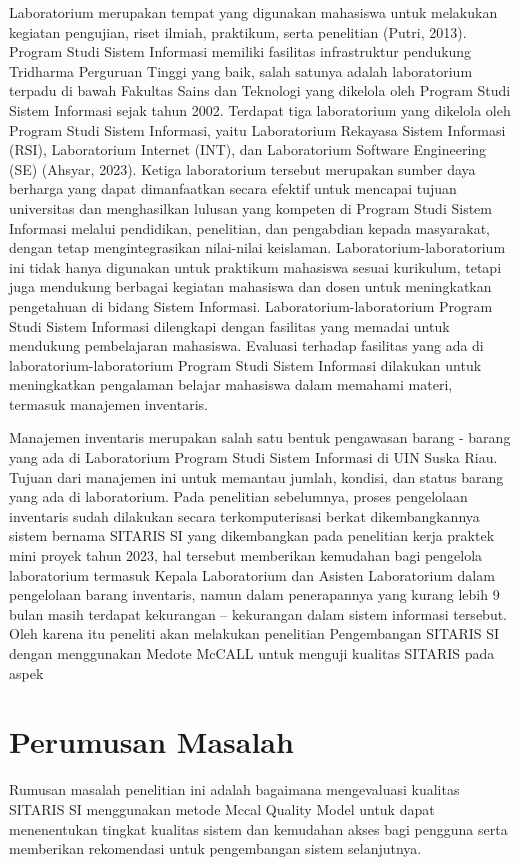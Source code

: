 Laboratorium merupakan tempat yang digunakan mahasiswa untuk melakukan kegiatan pengujian, riset ilmiah, praktikum, serta penelitian (Putri, 2013). Program Studi Sistem Informasi memiliki fasilitas infrastruktur pendukung Tridharma Perguruan Tinggi yang baik, salah satunya adalah laboratorium terpadu di bawah Fakultas Sains dan Teknologi yang dikelola oleh Program Studi Sistem Informasi sejak tahun 2002. Terdapat tiga laboratorium yang dikelola oleh Program Studi Sistem Informasi, yaitu Laboratorium Rekayasa Sistem Informasi (RSI), Laboratorium Internet (INT), dan Laboratorium Software Engineering (SE) (Ahsyar, 2023). Ketiga laboratorium tersebut merupakan sumber daya berharga yang dapat dimanfaatkan secara efektif untuk mencapai tujuan universitas dan menghasilkan lulusan yang kompeten di Program Studi Sistem Informasi melalui pendidikan, penelitian, dan pengabdian kepada masyarakat, dengan tetap mengintegrasikan nilai-nilai keislaman. Laboratorium-laboratorium ini tidak hanya digunakan untuk praktikum mahasiswa sesuai kurikulum, tetapi juga mendukung berbagai kegiatan mahasiswa dan dosen untuk meningkatkan pengetahuan di bidang Sistem Informasi. Laboratorium-laboratorium Program Studi Sistem Informasi dilengkapi dengan fasilitas yang memadai untuk mendukung pembelajaran mahasiswa. Evaluasi terhadap fasilitas yang ada di laboratorium-laboratorium Program Studi Sistem Informasi dilakukan untuk meningkatkan pengalaman belajar mahasiswa dalam memahami materi, termasuk manajemen inventaris.

Manajemen inventaris merupakan salah satu bentuk pengawasan barang - barang yang ada di Laboratorium Program Studi Sistem Informasi di UIN Suska Riau. Tujuan dari manajemen ini untuk memantau jumlah, kondisi, dan status barang yang ada di laboratorium. Pada penelitian sebelumnya, proses pengelolaan inventaris sudah dilakukan secara terkomputerisasi berkat dikembangkannya sistem bernama SITARIS SI yang dikembangkan pada penelitian kerja praktek mini proyek tahun 2023, hal tersebut memberikan kemudahan bagi pengelola laboratorium termasuk Kepala Laboratorium dan Asisten Laboratorium dalam pengelolaan barang inventaris, namun dalam penerapannya yang kurang lebih 9 bulan masih terdapat kekurangan – kekurangan dalam sistem informasi tersebut. Oleh karena itu peneliti akan melakukan penelitian Pengembangan SITARIS SI dengan menggunakan Medote McCALL untuk menguji kualitas SITARIS pada aspek

\section{Perumusan Masalah}
Rumusan masalah penelitian ini adalah bagaimana mengevaluasi kualitas SITARIS SI menggunakan metode Mccal Quality Model untuk dapat menenentukan tingkat kualitas sistem dan kemudahan akses bagi pengguna serta memberikan rekomendasi untuk pengembangan sistem selanjutnya.

